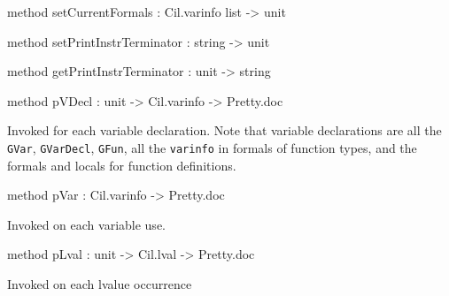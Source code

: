 \documentclass[11pt]{article}
\begin{document}
\begin{ocamldocobjectend}


\label{method:Cil.cilPrinter.setCurrentFormals}\begin{ocamldoccode}
method setCurrentFormals : Cil.varinfo list -> unit
\end{ocamldoccode}


\label{method:Cil.cilPrinter.setPrintInstrTerminator}\begin{ocamldoccode}
method setPrintInstrTerminator : string -> unit
\end{ocamldoccode}


\label{method:Cil.cilPrinter.getPrintInstrTerminator}\begin{ocamldoccode}
method getPrintInstrTerminator : unit -> string
\end{ocamldoccode}


\label{method:Cil.cilPrinter.pVDecl}\begin{ocamldoccode}
method pVDecl : unit -> Cil.varinfo -> Pretty.doc
\end{ocamldoccode}
\begin{ocamldocdescription}
Invoked for each variable declaration. Note that variable 
 declarations are all the {\tt{GVar}}, {\tt{GVarDecl}}, {\tt{GFun}}, all the {\tt{varinfo}} 
 in formals of function types, and the formals and locals for function 
 definitions.


\end{ocamldocdescription}


\label{method:Cil.cilPrinter.pVar}\begin{ocamldoccode}
method pVar : Cil.varinfo -> Pretty.doc
\end{ocamldoccode}
\begin{ocamldocdescription}
Invoked on each variable use.


\end{ocamldocdescription}


\label{method:Cil.cilPrinter.pLval}\begin{ocamldoccode}
method pLval : unit -> Cil.lval -> Pretty.doc
\end{ocamldoccode}
\begin{ocamldocdescription}
Invoked on each lvalue occurrence



\end{ocamldocdescription}
\end{ocamldocobjectend}
\end{document}
